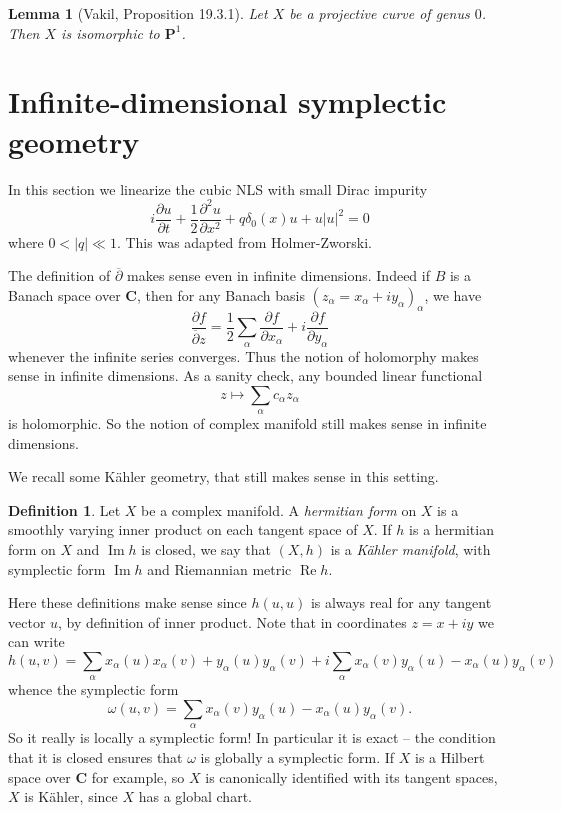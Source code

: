 \documentclass[reqno,12pt,letterpaper]{amsart}
\newcommand{\CC}{\mathbf{C}}
\newcommand{\PP}{\mathbf P}
\newcommand{\dbar}{\overline \partial}
\newcommand{\dfn}[1]{\emph{#1}\index{#1}}
\renewcommand{\Re}{\operatorname{Re}}
\renewcommand{\Im}{\operatorname{Im}}
\newtheorem{lemma}[theorem]{Lemma}
\theoremstyle{definition}
\newtheorem{definition}[theorem]{Definition}
\begin{document}
\begin{lemma}[Vakil, Proposition 19.3.1]
\label{curves of genus 0}
Let $X$ be a projective curve of genus $0$. Then $X$ is isomorphic to $\PP^1$.
\end{lemma}


\section{Infinite-dimensional symplectic geometry}
In this section we linearize the cubic NLS with small Dirac impurity
$$i \frac{\partial u}{\partial t} + \frac{1}{2} \frac{\partial^2 u}{\partial x^2} + q\delta_0(x)u + u|u|^2 = 0$$
where $0 < |q| \ll 1$. This was adapted from Holmer-Zworski.

The definition of $\dbar$ makes sense even in infinite dimensions.
Indeed if $B$ is a Banach space over $\CC$, then for any Banach basis $(z_\alpha = x_\alpha + iy_\alpha)_\alpha$, we have
$$\frac{\partial f}{\dbar z} = \frac{1}{2} \sum_\alpha \frac{\partial f}{\partial x_\alpha} + i\frac{\partial f}{\partial y_\alpha}$$
whenever the infinite series converges.
Thus the notion of holomorphy makes sense in infinite dimensions.
As a sanity check, any bounded linear functional
$$z \mapsto \sum_\alpha c_\alpha z_\alpha$$
is holomorphic.
So the notion of complex manifold still makes sense in infinite dimensions.

We recall some K\"ahler geometry, that still makes sense in this setting.
\begin{definition}
Let $X$ be a complex manifold. A \dfn{hermitian form} on $X$ is a smoothly varying inner product on each tangent space of $X$.
If $h$ is a hermitian form on $X$ and $\Im h$ is closed, we say that $(X, h)$ is a \dfn{K\"ahler manifold}, with symplectic form $\Im h$ and Riemannian metric $\Re h$.
\end{definition}
Here these definitions make sense since $h(u, u)$ is always real for any tangent vector $u$, by definition of inner product.
Note that in coordinates $z = x + iy$ we can write
$$h(u, v) = \sum_\alpha x_\alpha(u) x_\alpha(v) + y_\alpha(u) y_\alpha(v) + i\sum_\alpha x_\alpha(v) y_\alpha(u) - x_\alpha(u) y_\alpha(v)$$
whence the symplectic form
$$\omega(u, v) = \sum_\alpha x_\alpha(v) y_\alpha(u) - x_\alpha(u) y_\alpha(v).$$
So it really is locally a symplectic form!
In particular it is exact -- the condition that it is closed ensures that $\omega$ is globally a symplectic form.
If $X$ is a Hilbert space over $\CC$ for example, so $X$ is canonically identified with its tangent spaces, $X$ is K\"ahler, since $X$ has a global chart.
\end{document}
